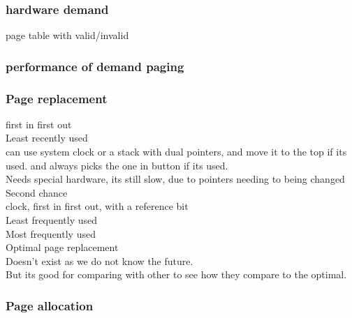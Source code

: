 \documentclass[a4paper,10pt,titlepage]{report}
\begin{document}
\subsubsection{hardware demand}
page table with valid/invalid\\

\subsubsection{performance of demand paging}

\subsubsection{Page replacement}
\hspace{10mm} first in first out\\
\hspace{10mm} Least recently used\\
\hspace{15mm} can use system clock or a stack with dual pointers, and move it to the top if its used. and always picks the one in button if its used.\\
\hspace{15mm} Needs special hardware, its still slow, due to pointers needing to being changed \\
\hspace{10mm} Second chance \\
\hspace{15mm} clock, first in first out, with a reference bit \\

\hspace{10mm} Least frequently used\\

\hspace{10mm} Most frequently used\\

\hspace{10mm} Optimal page replacement \\
\hspace{15mm}Doesn't exist as we do not know the future. \\
\hspace{15mm}But its good for comparing with other to see how they compare to the optimal.\\

\subsubsection{Page allocation}
\end{document}
